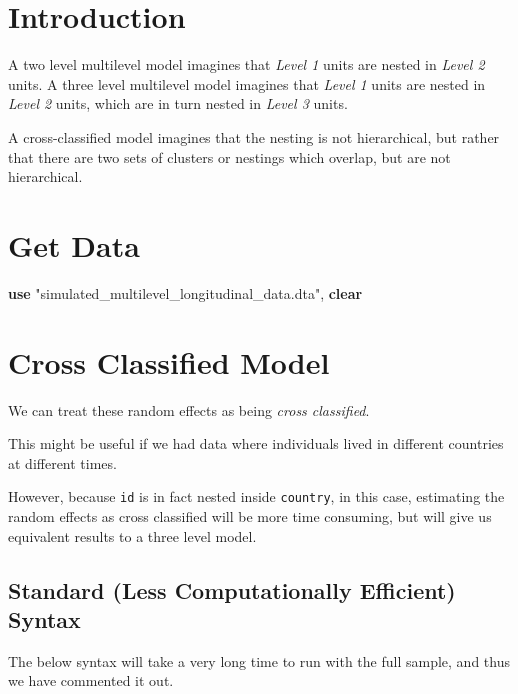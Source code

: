 \documentclass[
  letterpaper,
  DIV=11,
  numbers=noendperiod]{scrreprt}
\newenvironment{Shaded}{\begin{snugshade}}{\end{snugshade}}
\newcommand{\KeywordTok}[1]{\textcolor[rgb]{0.00,0.23,0.31}{\textbf{#1}}}
\newcommand{\NormalTok}[1]{\textcolor[rgb]{0.00,0.23,0.31}{#1}}
\newcommand{\StringTok}[1]{\textcolor[rgb]{0.13,0.47,0.30}{#1}}
\begin{document}
\section{Introduction}\label{introduction-1}

A two level multilevel model imagines that \emph{Level 1} units are
nested in \emph{Level 2} units. A three level multilevel model imagines
that \emph{Level 1} units are nested in \emph{Level 2} units, which are
in turn nested in \emph{Level 3} units.

A cross-classified model imagines that the nesting is not hierarchical,
but rather that there are two sets of clusters or nestings which
overlap, but are not hierarchical.

\section{Get Data}\label{get-data-2}

\begin{Shaded}
\begin{Highlighting}[]

\KeywordTok{use} \StringTok{"simulated\_multilevel\_longitudinal\_data.dta"}\NormalTok{, }\KeywordTok{clear}
\end{Highlighting}
\end{Shaded}

\section{Cross Classified Model}\label{cross-classified-model}

We can treat these random effects as being \emph{cross classified}.

This might be useful if we had data where individuals lived in different
countries at different times.

However, because \texttt{id} is in fact nested inside \texttt{country},
in this case, estimating the random effects as cross classified will be
more time consuming, but will give us equivalent results to a three
level model.

\subsection{Standard (Less Computationally Efficient)
Syntax}\label{standard-less-computationally-efficient-syntax}

The below syntax will take a very long time to run with the full sample,
and thus we have commented it out.
\end{document}
